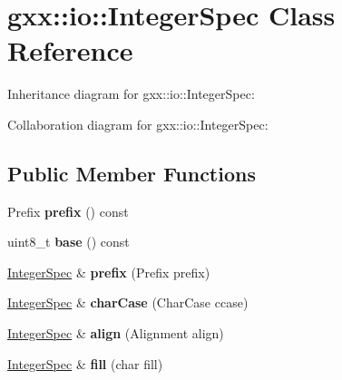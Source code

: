 \hypertarget{classgxx_1_1io_1_1IntegerSpec}{}\section{gxx\+:\+:io\+:\+:Integer\+Spec Class Reference}
\label{classgxx_1_1io_1_1IntegerSpec}


Inheritance diagram for gxx\+:\+:io\+:\+:Integer\+Spec\+:


Collaboration diagram for gxx\+:\+:io\+:\+:Integer\+Spec\+:
\subsection*{Public Member Functions}
\begin{DoxyCompactItemize}
\item 
Prefix {\bfseries prefix} () const \hypertarget{classgxx_1_1io_1_1IntegerSpec_a2bd116d6a9be20f97093f8620b2b97a7}{}\label{classgxx_1_1io_1_1IntegerSpec_a2bd116d6a9be20f97093f8620b2b97a7}

\item 
uint8\+\_\+t {\bfseries base} () const \hypertarget{classgxx_1_1io_1_1IntegerSpec_a4dfab96d86e8f1e390f8e460708df353}{}\label{classgxx_1_1io_1_1IntegerSpec_a4dfab96d86e8f1e390f8e460708df353}

\item 
\hyperlink{classgxx_1_1io_1_1IntegerSpec}{Integer\+Spec} \& {\bfseries prefix} (Prefix prefix)\hypertarget{classgxx_1_1io_1_1IntegerSpec_a5fbabc2553e9f718113f5092ebe07478}{}\label{classgxx_1_1io_1_1IntegerSpec_a5fbabc2553e9f718113f5092ebe07478}

\item 
\hyperlink{classgxx_1_1io_1_1IntegerSpec}{Integer\+Spec} \& {\bfseries char\+Case} (Char\+Case ccase)\hypertarget{classgxx_1_1io_1_1IntegerSpec_af1c607a88a0b9532e85fa63ae3330fc7}{}\label{classgxx_1_1io_1_1IntegerSpec_af1c607a88a0b9532e85fa63ae3330fc7}

\item 
\hyperlink{classgxx_1_1io_1_1IntegerSpec}{Integer\+Spec} \& {\bfseries align} (Alignment align)\hypertarget{classgxx_1_1io_1_1IntegerSpec_a2869a24de38b46107b897561156ff71f}{}\label{classgxx_1_1io_1_1IntegerSpec_a2869a24de38b46107b897561156ff71f}

\item 
\hyperlink{classgxx_1_1io_1_1IntegerSpec}{Integer\+Spec} \& {\bfseries fill} (char fill)\hypertarget{classgxx_1_1io_1_1IntegerSpec_a01a0bc39b1cdc2201715c576accd2f21}{}\label{classgxx_1_1io_1_1IntegerSpec_a01a0bc39b1cdc2201715c576accd2f21}


\end{DoxyCompactItemize}

